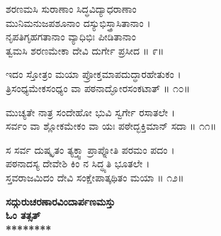 ಶರಣಮಸಿ ಸುರಾಣಾಂ ಸಿದ್ಧವಿದ್ಯಾಧರಾಣಾಂ\\
     ಮುನಿಮನುಜಪಶೂನಾಂ ದಸ್ಯುಭಿಸ್ತ್ರಾಸಿತಾನಾಂ ।\\
ನೃಪತಿಗೃಹಗತಾನಾಂ ವ್ಯಾಧಿಭಿಃ ಪೀಡಿತಾನಾಂ\\
     ತ್ವಮಸಿ ಶರಣಮೇಕಾ ದೇವಿ ದುರ್ಗೇ ಪ್ರಸೀದ ॥ ೯॥

ಇದಂ ಸ್ತೋತ್ರಂ ಮಯಾ ಪ್ರೋಕ್ತಮಾಪದುದ್ಧಾರಹೇತುಕಂ ।\\
ತ್ರಿಸಂಧ್ಯಮೇಕಸಂಧ್ಯಂ ವಾ ಪಠನಾದ್ಘೋರಸಂಕಟಾತ್ ॥ ೧೦॥

ಮುಚ್ಯತೇ ನಾತ್ರ ಸಂದೇಹೋ ಭುವಿ ಸ್ವರ್ಗೇ ರಸಾತಲೇ ।\\
ಸರ್ವಂ ವಾ ಶ್ಲೋಕಮೇಕಂ ವಾ ಯಃ ಪಠೇದ್ಭಕ್ತಿಮಾನ್ ಸದಾ ॥ ೧೧॥

ಸ ಸರ್ವ ದುಷ್ಕೃತಂ ತ್ಯಕ್ತ್ವಾ ಪ್ರಾಪ್ನೋತಿ ಪರಮಂ ಪದಂ ।\\
ಪಠನಾದಸ್ಯ ದೇವೇಶಿ ಕಿಂ ನ ಸಿದ್ಧ್ಯತಿ ಭೂತಲೇ ।\\
ಸ್ತವರಾಜಮಿದಂ ದೇವಿ ಸಂಕ್ಷೇಪಾತ್ಕಥಿತಂ ಮಯಾ ॥ ೧೨॥
\begin{center}{\LARGE\bfseries ಸದ್ಗುರುಚರಣಾರವಿಂದಾರ್ಪಣಮಸ್ತು\\ಓಂ ತತ್ಸತ್\\********}\end{center}
